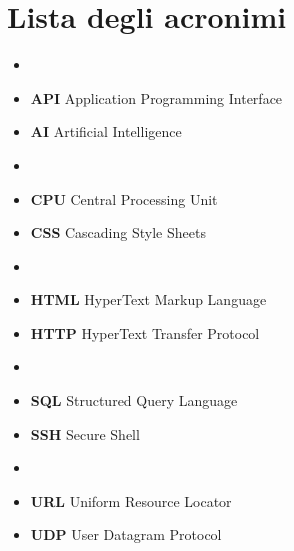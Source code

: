 \newenvironment{acronymlist}
{\begin{itemize}[label={},leftmargin=*,align=left]}
{\end{itemize}}

\newcommand{\acronym}[2]{\item \textbf{#1} #2}

\newcommand{\lettergroup}[1]{\item[\textbf{#1}]}


\chapter{Lista degli acronimi}

\begin{multicols}{2} %
\begin{acronymlist}
    \lettergroup{A}
    \acronym{API}{Application Programming Interface}
    \acronym{AI}{Artificial Intelligence}

    \lettergroup{C}
    \acronym{CPU}{Central Processing Unit}
    \acronym{CSS}{Cascading Style Sheets}

    \lettergroup{H}
    \acronym{HTML}{HyperText Markup Language}
    \acronym{HTTP}{HyperText Transfer Protocol}

    \lettergroup{S}
    \acronym{SQL}{Structured Query Language}
    \acronym{SSH}{Secure Shell}

    \lettergroup{U}
    \acronym{URL}{Uniform Resource Locator}
    \acronym{UDP}{User Datagram Protocol}
\end{acronymlist}
\end{multicols} %